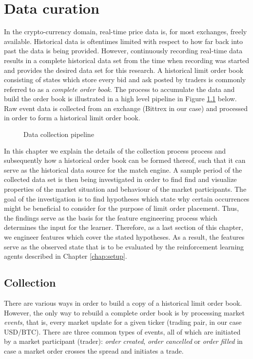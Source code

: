 \chapter{Data curation}
\label{chap:data}

In the crypto-currency domain, real-time price data is, for most exchanges, freely available. Historical data is oftentimes limited with respect to how far back into past the data is being provided. However, continuously recording real-time data results in a complete historical data set from the time when recording was started and provides the desired data set for this research.
A historical limit order book consisting of states which store every bid and ask posted by traders is commonly referred to as a \textit{complete order book}.
The process to accumulate the data and build the order book is illustrated in a high level pipeline in Figure \ref{fig:data-pipeline} below.
Raw event data is collected from an exchange (Bittrex in our case) and processed in order to form a historical limit order book.
\begin{figure}[H]
    \centering
    \caption{Data collection pipeline}
    \label{fig:data-pipeline}
\end{figure}

In this chapter we explain the details of the collection process process and subsequently how a historical order book can be formed thereof, such that it can serve as the historical data source for the match engine.
A sample period of the collected data set is then being investigated in order to find find and visualize properties of the market situation and behaviour of the market participants.
The goal of the investigation is to find hypotheses which state why certain occurrences might be beneficial to consider for the purpose of limit order placement.
Thus, the findings serve as the basis for the feature engineering process which determines the input for the learner.
Therefore, as a last section of this chapter, we engineer features which cover the stated hypotheses.
As a result, the features serve as the observed state that is to be evaluated by the reinforcement learning agents described in Chapter \ref{chap:setup}.

\section{Collection}
\label{sec:data-collection}

There are various ways in order to build a copy of a historical limit order book. However, the only way to rebuild a complete order book is by processing market \textit{events}, that is, every market update for a given ticker (trading pair, in our case USD/BTC).
There are three common types of events, all of which are initiated by a market participant (trader): \textit{order created}, \textit{order cancelled} or \textit{order filled} in case a market order crosses the spread and initiates a trade.


